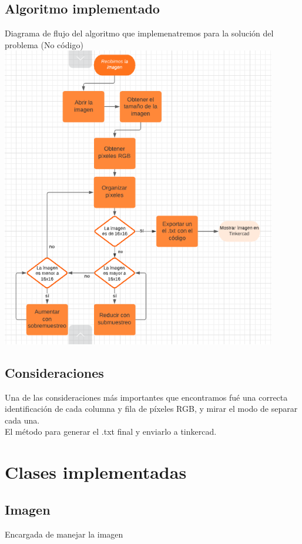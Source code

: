 \documentclass{article}
\begin{document}
\subsection{Algoritmo implementado}
Diagrama de flujo del algoritmo que implemenatremos para la solución del problema (No código)\\
\includegraphics[width=12cm]{Imagenes/Algo.png}

\subsection{Consideraciones}
Una de las consideraciones más importantes que encontramos fué una correcta identificación de cada columna y fila de píxeles RGB, y mirar el modo de separar cada una.\\
El método para generar el .txt final y enviarlo a tinkercad.\\

\section{Clases implementadas}
\subsection{Imagen}
Encargada de manejar la imagen\\
\end{document}

